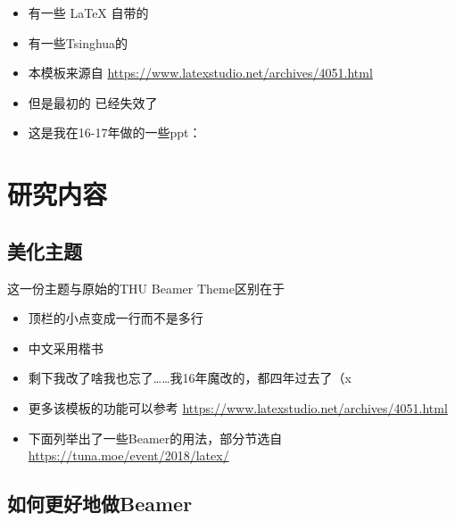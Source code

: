 \documentclass[aspectratio=169]{beamer}
\begin{document}
\begin{frame}
    \begin{itemize}
        \item 有一些 \LaTeX{} 自带的
        \item 有一些Tsinghua的
        \item 本模板来源自 \newline \url{https://www.latexstudio.net/archives/4051.html}
        \item 但是最初的 \href{http://far.tooold.cn/post/latex/beamertsinghua}{\color{purple}{link}} \cite{origin}已经失效了
        \item 这是我在16-17年做的一些ppt：\href{https://github.com/Trinkle23897/oi_slides}{\color{purple}{戳我}}
    \end{itemize}
\end{frame}


\section{研究内容}

\subsection{美化主题}

\begin{frame}{这一份主题与原始的THU Beamer Theme区别在于}
    \begin{itemize}
        \item 顶栏的小点变成一行而不是多行
        \item 中文采用楷书
        \item 剩下我改了啥我也忘了……我16年魔改的，都四年过去了（x
        \item 更多该模板的功能可以参考 \url{https://www.latexstudio.net/archives/4051.html}
        \item 下面列举出了一些Beamer的用法，部分节选自 \url{https://tuna.moe/event/2018/latex/}
    \end{itemize}
\end{frame}

\subsection{如何更好地做Beamer}
\end{document}
